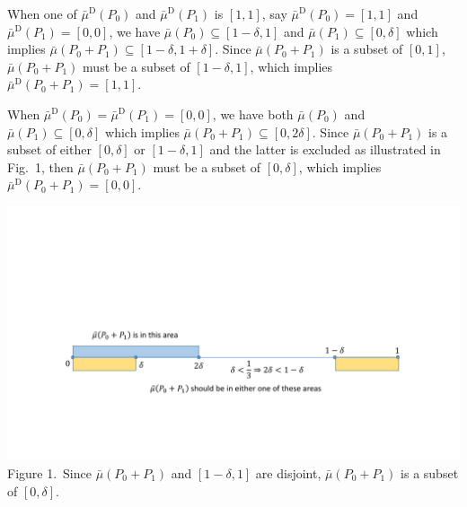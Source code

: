 \documentclass[english,reprint, aps, prl,superscriptaddress, showpacs,
showkeys, longbibliography, amsmath, amssymb, floatfix]{revtex4-1}
\theoremstyle{plain}
\theoremstyle{definition}
\newcommand{\imposs}{\ensuremath{\left[0,0\right]}}
\newcommand{\necess}{\ensuremath{\left[1,1\right]}}
\begin{document}
When one of $\bar{\mu}^{\textrm{D}}\left(P_{0}\right)$ and $\bar{\mu}^{\textrm{D}}\left(P_{1}\right)$
is $\necess$, say $\bar{\mu}^{\textrm{D}}\left(P_{0}\right)=\necess$
and $\bar{\mu}^{\textrm{D}}\left(P_{1}\right)=\imposs$, we have $\bar{\mu}\left(P_{0}\right)\subseteq\left[1-\delta,1\right]$
and $\bar{\mu}\left(P_{1}\right)\subseteq\left[0,\delta\right]$ which
implies $\bar{\mu}\left(P_{0}+P_{1}\right)\subseteq\left[1-\delta,1+\delta\right]$.
Since $\bar{\mu}\left(P_{0}+P_{1}\right)$ is a subset of $\left[0,1\right]$,
$\bar{\mu}\left(P_{0}+P_{1}\right)$ must be a subset of $\left[1-\delta,1\right]$,
which implies $\bar{\mu}^{\textrm{D}}\left(P_{0}+P_{1}\right)=\necess$.

When $\bar{\mu}^{\textrm{D}}\left(P_{0}\right)=\bar{\mu}^{\textrm{D}}\left(P_{1}\right)=\imposs$,
we have both $\bar{\mu}\left(P_{0}\right)$ and $\bar{\mu}\left(P_{1}\right)\subseteq\left[0,\delta\right]$
which implies $\bar{\mu}\left(P_{0}+P_{1}\right)\subseteq\left[0,2\delta\right]$.
Since $\bar{\mu}\left(P_{0}+P_{1}\right)$ is a subset of either $\left[0,\delta\right]$
or $\left[1-\delta,1\right]$ and the latter is excluded as illustrated
in Fig.~1, then $\bar{\mu}\left(P_{0}+P_{1}\right)$ must be a subset
of $\left[0,\delta\right]$, which implies $\bar{\mu}^{\textrm{D}}\left(P_{0}+P_{1}\right)=\imposs$.
\begin{widetext}
\begin{center}
\includegraphics[bb=50bp 100bp 900bp 300bp,clip,scale=0.5]{prop_prop_letter_ajhs_referee_response_pptx}\\
Figure 1.~\label{fig:Show-subset}Since $\bar{\mu}\left(P_{0}+P_{1}\right)$
and $\left[1-\delta,1\right]$ are disjoint, $\bar{\mu}\left(P_{0}+P_{1}\right)$
is a subset of $\left[0,\delta\right]$.
\par\end{center}
\end{widetext}
\end{document}
